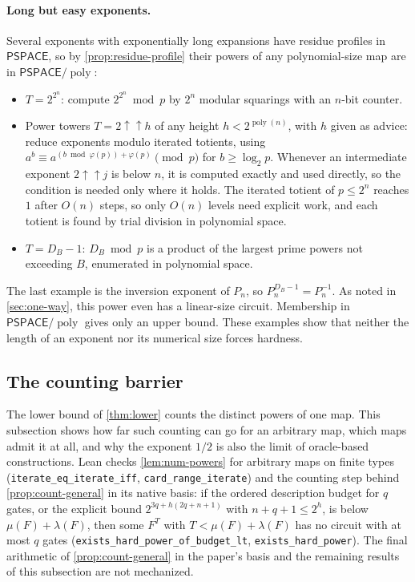 \documentclass[11pt]{article}
\theoremstyle{definition}
\theoremstyle{remark}
\newcommand{\poly}{\operatorname{poly}}
\numberwithin{equation}{section}
\begin{document}
\paragraph{Long but easy exponents.}
Several exponents with exponentially long expansions have residue
profiles in $\mathsf{PSPACE}$, so by \cref{prop:residue-profile} their
powers of any polynomial-size map are in $\mathsf{PSPACE}/\poly$:
\begin{itemize}
\item $T=2^{2^n}$: compute $2^{2^n}\bmod p$ by $2^n$ modular squarings
  with an $n$-bit counter.
\item Power towers $T=2\uparrow\uparrow h$ of any height
  $h<2^{\poly(n)}$, with $h$ given as advice: reduce exponents modulo iterated totients, using
  $a^b\equiv a^{(b\bmod\varphi(p))+\varphi(p)}\pmod p$ for
  $b\geq\log_2p$.  Whenever an intermediate exponent
  $2\uparrow\uparrow j$ is below $n$, it is computed exactly and used
  directly, so the condition is needed only where it holds.
  The iterated totient of $p\leq2^n$ reaches $1$ after
  $O(n)$ steps, so only $O(n)$ levels need explicit work, and each
  totient is found by trial division in polynomial space.
\item $T=D_B-1$: $D_B\bmod p$ is a product of the largest prime powers
  not exceeding $B$, enumerated in polynomial space.
\end{itemize}
The last example is the inversion exponent of $P_n$, so
$P_n^{D_B-1}=P_n^{-1}$.  As noted in \cref{sec:one-way}, this power even
has a linear-size circuit.  Membership in $\mathsf{PSPACE}/\poly$ gives
only an upper bound.  These examples show that neither the length of an
exponent nor its numerical size forces hardness.

\subsection{The counting barrier}\label{sec:counting-barrier}

The lower bound of \cref{thm:lower} counts the distinct powers of one
map.  This subsection shows how far such counting can go for an
arbitrary map, which maps admit it at all, and why the exponent $1/2$
is also the limit of oracle-based constructions.  Lean checks
\cref{lem:num-powers} for arbitrary maps on finite types
(\texttt{iterate\_eq\_iterate\_iff}, \texttt{card\_range\_iterate}) and
the counting step behind \cref{prop:count-general} in its native basis:
if the ordered description budget for $q$ gates, or the explicit bound
$2^{3q+h(2q+n+1)}$ with $n+q+1\leq2^h$, is below $\mu(F)+\lambda(F)$, then
some $F^T$ with $T<\mu(F)+\lambda(F)$ has no circuit with at most $q$ gates
(\texttt{exists\_hard\_power\_of\_budget\_lt},
\texttt{exists\_hard\_power}).  The final arithmetic of
\cref{prop:count-general} in the paper's basis and the remaining results
of this subsection are not mechanized.
\end{document}
